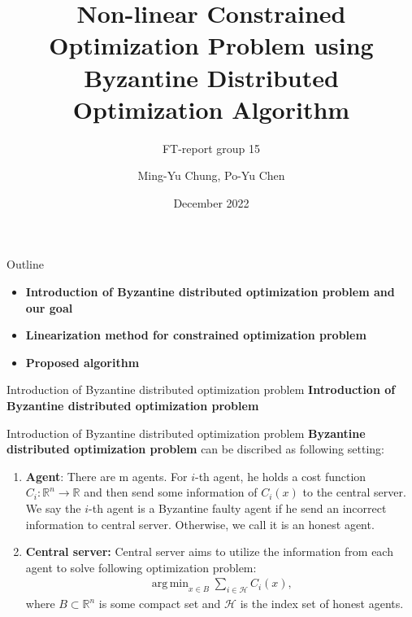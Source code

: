 \documentclass{beamer}
\title[FT-report\hspace{2em}\insertframenumber/ \inserttotalframenumber]{Non-linear Constrained Optimization Problem using Byzantine Distributed Optimization Algorithm}
\subtitle{FT-report group 15}
\author{Ming-Yu Chung, Po-Yu Chen}
\institute{}
\date{December 2022}
\DeclareMathOperator*{\argmin}{arg\,min}
\begin{document}
\frame{\titlepage}


\begin{frame}{Outline}
\begin{itemize}
\item \textbf{Introduction of Byzantine distributed optimization problem and our goal}
\item \textbf{Linearization method for constrained optimization problem}
\item \textbf{Proposed algorithm}
\end{itemize}
\end{frame}

\begin{frame}{Introduction of Byzantine distributed optimization problem}
    \centering
    \textbf{Introduction of Byzantine distributed optimization problem}
\end{frame}

\begin{frame}{Introduction of Byzantine distributed optimization problem}
\textbf{Byzantine distributed optimization problem} can be discribed as following setting:
\begin{enumerate}
    \item \textbf{Agent}: There are m agents. For $i$-th agent, he holds a cost function $C_i:\mathbb{R}^n \rightarrow \mathbb{R}$ and then send some information of $C_i(x)$ to the central server. We say the $i$-th agent is a Byzantine faulty agent if he send an incorrect information to central server. Otherwise, we call it is an honest agent.
    \item \textbf{Central server:} Central server aims to utilize the information from each agent to solve following optimization problem:
    \begin{align}
        \argmin_{x\in B} \sum_{i\in\mathcal{H}} C_i(x), \label{bdop}
    \end{align}
    where $B \subset \mathbb{R}^n$ is some compact set and $\mathcal{H}$ is the index set of honest agents.
\end{enumerate}
\end{frame}
\end{document}
